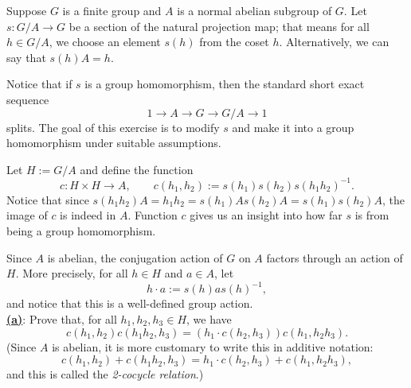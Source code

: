 \documentclass[12pt]{article}
\begin{document}
\begin{homeworkProblem}
  Suppose $G$ is a finite group and $A$ is a normal abelian subgroup of $G$.  
  Let $s : G/A \to G$ be a section of the natural projection map; that means for all $h \in G/A$, we choose an element $s(h)$ from the coset $h$. Alternatively, we can say that $s(h)A = h$.  

  Notice that if $s$ is a group homomorphism, then the standard short exact sequence
  \[
    1 \to A \to G \to G/A \to 1
  \]
  splits.  
  The goal of this exercise is to modify $s$ and make it into a group homomorphism under suitable assumptions.  

  Let $H := G/A$ and define the function
  \[
    c : H \times H \to A, \qquad c(h_1, h_2) := s(h_1)s(h_2)s(h_1h_2)^{-1}.
  \]
  Notice that since $s(h_1h_2)A = h_1h_2 = s(h_1)As(h_2)A = s(h_1)s(h_2)A$, the image of $c$ is indeed in $A$.  
  Function $c$ gives us an insight into how far $s$ is from being a group homomorphism.  

  Since $A$ is abelian, the conjugation action of $G$ on $A$ factors through an action of $H$. More precisely, for all $h \in H$ and $a \in A$, let
  \[
    h \cdot a := s(h) a s(h)^{-1},
  \]
  and notice that this is a well-defined group action.\\

  \underline{\textbf{(a)}}: Prove that, for all $h_1, h_2, h_3 \in H$, we have
  \[
    c(h_1, h_2)c(h_1h_2, h_3) = (h_1 \cdot c(h_2, h_3)) c(h_1, h_2h_3).
  \]
  (Since $A$ is abelian, it is more customary to write this in additive notation:
  \[
    c(h_1, h_2) + c(h_1h_2, h_3) = h_1 \cdot c(h_2, h_3) + c(h_1, h_2h_3),
  \]
  and this is called the \emph{2-cocycle relation}.)\\


\end{homeworkProblem}
\end{document}
